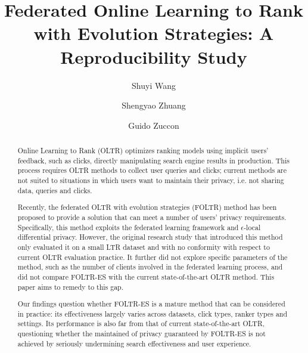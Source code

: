 \documentclass[runningheads]{llncs}
\begin{document}

\title{Federated Online Learning to Rank with Evolution Strategies: A Reproducibility Study}


\author{Shuyi Wang \and Shengyao Zhuang \and Guido Zuccon }



\maketitle

\begin{abstract}
Online Learning to Rank (OLTR) optimizes ranking models using implicit users' feedback, such as clicks, directly manipulating search engine results in production. This process requires OLTR methods to collect user queries and clicks; current methods are not suited to situations in which users want to maintain their privacy, i.e. not sharing data, queries and clicks. 

Recently, the federated OLTR with evolution strategies (FOLTR) method has been proposed to provide a solution that can meet a number of users' privacy requirements. Specifically, this method exploits the federated learning framework and $\epsilon$-local differential privacy. However, the original research study that introduced this method only evaluated it on a small LTR dataset and with no conformity with respect to current OLTR evaluation practice. It further did not explore specific parameters of the method, such as the number of clients involved in the federated learning process, and did not compare FOLTR-ES with the current state-of-the-art OLTR method. This paper aims to remedy to this gap. 

Our findings question whether FOLTR-ES is a mature method that can be considered in practice: its effectiveness largely varies across datasets, click types, ranker types and settings. Its performance is also far from that of current state-of-the-art OLTR, questioning whether the maintained of privacy guaranteed by FOLTR-ES is not achieved by seriously undermining search effectiveness and user experience. 



\end{abstract}
\end{document}

